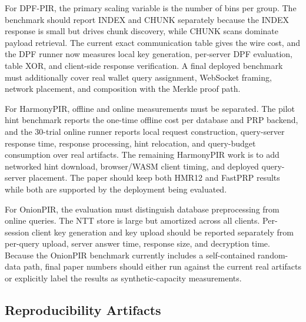 For DPF-PIR, the primary scaling variable is the number of bins per group. The benchmark should report INDEX and CHUNK separately because the INDEX response is small but drives chunk discovery, while CHUNK scans dominate payload retrieval. The current exact communication table gives the wire cost, and the DPF runner now measures local key generation, per-server DPF evaluation, table XOR, and client-side response verification. A final deployed benchmark must additionally cover real wallet query assignment, WebSocket framing, network placement, and composition with the Merkle proof path.

For HarmonyPIR, offline and online measurements must be separated. The pilot hint benchmark reports the one-time offline cost per database and PRP backend, and the 30-trial online runner reports local request construction, query-server response time, response processing, hint relocation, and query-budget consumption over real artifacts. The remaining HarmonyPIR work is to add networked hint download, browser/WASM client timing, and deployed query-server placement. The paper should keep both HMR12 and FastPRP results while both are supported by the deployment being evaluated.

For OnionPIR, the evaluation must distinguish database preprocessing from online queries. The NTT store is large but amortized across all clients. Per-session client key generation and key upload should be reported separately from per-query upload, server answer time, response size, and decryption time. Because the OnionPIR benchmark currently includes a self-contained random-data path, final paper numbers should either run against the current real artifacts or explicitly label the results as synthetic-capacity measurements.

\subsection{Reproducibility Artifacts}

